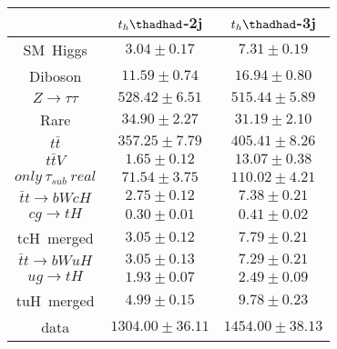 \centering
\begin{tabular}{ccc} \toprule\toprule
 & $t_{h}\thadhad$-2j & $t_{h}\thadhad$-3j\\\midrule
 SM~Higgs & $3.04\pm0.17$ & $7.31\pm0.19$\\
 Diboson & $11.59\pm0.74$ & $16.94\pm0.80$\\
 $Z\to\tau\tau$ & $528.42\pm6.51$ & $515.44\pm5.89$\\
 Rare & $34.90\pm2.27$ & $31.19\pm2.10$\\
 $t\bar{t}$ & $357.25\pm7.79$ & $405.41\pm8.26$\\
 $t\bar{t}V$ & $1.65\pm0.12$ & $13.07\pm0.38$\\
 $only~\tau_{sub}~real$ & $71.54\pm3.75$ & $110.02\pm4.21$\\\midrule
$\bar{t}t\to bWcH$ & $2.75\pm0.12$ & $7.38\pm0.21$\\
$cg\to tH$ & $0.30\pm0.01$ & $0.41\pm0.02$\\
tcH~merged & $3.05\pm0.12$ & $7.79\pm0.21$\\
$\bar{t}t\to bWuH$ & $3.05\pm0.13$ & $7.29\pm0.21$\\
$ug\to tH$ & $1.93\pm0.07$ & $2.49\pm0.09$\\
tuH~merged & $4.99\pm0.15$ & $9.78\pm0.23$\\\midrule
data & $1304.00\pm36.11$ & $1454.00\pm38.13$\\
\bottomrule\bottomrule
\end{tabular}